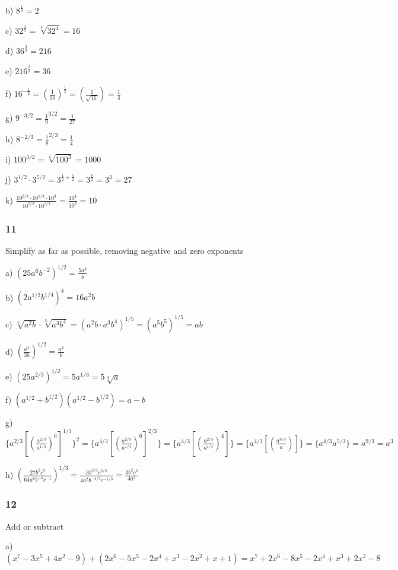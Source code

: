 \documentclass[]{report}
\begin{document}
b) $8^{\frac{1}{3}} = 2$

c) $32^{\frac{4}{5}} = \sqrt[5]{32^4} = 16$

d) $36^{\frac{3}{2}} = 216$	

e) $216^{\frac{2}{3}} = 36$

f) $16^{-\frac{1}{2}} = (\frac{1}{16})^{\frac{1}{2}} = (\frac{1}{\sqrt{16}}) = \frac{1}{4}$

g) $ 9^{-3/2} = \frac{1}{9}^{3/2} = \frac{1}{27}$

h) $8^{-2/3} = \frac{1}{8}^{2/3} = \frac{1}{4}$

i) $ 100^{3/2} = \sqrt[2]{100^3} = 1000$

j) $3^{1/2} \cdot 3^{5/2} = 3^{\frac{1}{2} + \frac{5}{2}} = 3^{\frac{6}{2}} = 3^3 = 27$

k) $\frac{10^{2/3} \cdot 10^{1/3} \cdot 10^3}{10^{5/2} \cdot 10^{1/2}} = \frac{10^4}{10^3} = 10$

\subsubsection{11}
Simplify as far as possible, removing negative and zero exponents

a) $(25a^6b^{-2})^{1/2} = \frac{5a^3}{b}$


b) $(2a^{1/2}b^{1/4})^4 = 16a^2b$

c) $\sqrt[5]{a^2b} \cdot \sqrt[5]{a^3b^4} = (a^2b \cdot a^3b^4)^{1/5} = (a^5b^5)^{1/5} = ab$

d) $(\frac{a^4}{36})^{1/2} = \frac{a^2}{6}$

e) $(25a^{2/3})^{1/2} = 5a^{1/3} = 5\sqrt[3]{a}$

f) $(a^{1/2} + b^{1/2})(a^{1/2} - b^{1/2}) = a - b$

g) $\{a^{2/3} [(\frac{a^{2/3}}{a^{1/4}})^6]^{1/3}\}^2 = \{a^{4/3} [(\frac{a^{2/3}}{a^{1/4}})^6]^{2/3}\} = \{a^{4/3} [(\frac{a^{2/3}}{a^{1/4}})^4]\} = \{a^{4/3} [(\frac{a^{8/3}}{a})]\} =  \{a^{4/3} a^{5/3}\} = a^{9/3} = a^3$

h) $(\frac{27b^2c^5}{64a^6b^{-4}c^{-1}})^{1/3} =  \frac{3b^{2/3}c^{5/3}}{4a^2b^{-4/3}c^{-1/3}} = \frac{3b^2c^2}{4a^2}$



\subsubsection{12}

Add or subtract


a) $(x^7 - 3x^5 + 4x^2 - 9) + (2x^6 - 5x^5 - 2x^4 + x^3 - 2x^2 + x + 1) = x^7 + 2x^6 - 8x^5 - 2x^4 + x^3 + 2x^2 - 8$
\end{document}
